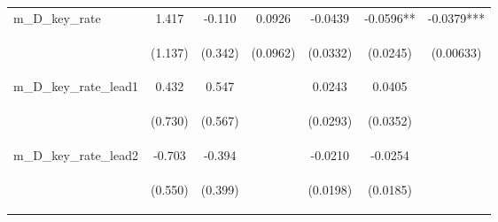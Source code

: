 \documentclass[]{article}
\begin{document}
\begin{center}
\begin{tabular}{lcccccc}
m\_D\_key\_rate & 1.417 & -0.110 & 0.0926 & -0.0439 & -0.0596** & -0.0379*** \\
\vspace{4pt} & \begin{footnotesize}(1.137)\end{footnotesize} & \begin{footnotesize}(0.342)\end{footnotesize} & \begin{footnotesize}(0.0962)\end{footnotesize} & \begin{footnotesize}(0.0332)\end{footnotesize} & \begin{footnotesize}(0.0245)\end{footnotesize} & \begin{footnotesize}(0.00633)\end{footnotesize} \\
m\_D\_key\_rate\_lead1 & 0.432 & 0.547 &  & 0.0243 & 0.0405 &  \\
\vspace{4pt} & \begin{footnotesize}(0.730)\end{footnotesize} & \begin{footnotesize}(0.567)\end{footnotesize} & \begin{footnotesize}\end{footnotesize} & \begin{footnotesize}(0.0293)\end{footnotesize} & \begin{footnotesize}(0.0352)\end{footnotesize} & \begin{footnotesize}\end{footnotesize} \\
m\_D\_key\_rate\_lead2 & -0.703 & -0.394 &  & -0.0210 & -0.0254 &  \\
\vspace{4pt} & \begin{footnotesize}(0.550)\end{footnotesize} & \begin{footnotesize}(0.399)\end{footnotesize} & \begin{footnotesize}\end{footnotesize} & \begin{footnotesize}(0.0198)\end{footnotesize} & \begin{footnotesize}(0.0185)\end{footnotesize} & \begin{footnotesize}\end{footnotesize} \\

\end{tabular}
\end{center}
\end{document}
